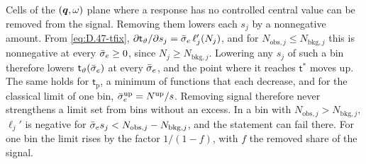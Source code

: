 Cells of the $(\bm{q},\omega)$ plane where a response has no controlled central value can be removed from the signal. Removing them lowers each $s_j$ by a nonnegative amount. From \cref{eq:D.47-tfix}, $\partial\mathsf{t}_\vartheta/\partial s_j = \bar{\sigma}_{e}\,\ell_j'(N_j)$, and for $N_{\mathrm{obs},j} \le N_{\mathrm{bkg},j}$ this is nonnegative at every $\bar{\sigma}_{e} \ge 0$, since $N_j \ge N_{\mathrm{bkg},j}$. Lowering any $s_j$ of such a bin therefore lowers $\mathsf{t}_\vartheta(\bar{\sigma}_{e})$ at every $\bar{\sigma}_{e}$, and the point where it reaches $\mathsf{t}^*$ moves up. The same holds for $\mathsf{t}_{\mathrm{p}}$, a minimum of functions that each decrease, and for the classical limit of one bin, $\bar{\sigma}_{e}^{\mathrm{up}} = N^{\mathrm{up}}/s$. Removing signal therefore never strengthens a limit set from bins without an excess. In a bin with $N_{\mathrm{obs},j} > N_{\mathrm{bkg},j}$, $\ell_j'$ is negative for $\bar{\sigma}_{e} s_j < N_{\mathrm{obs},j} - N_{\mathrm{bkg},j}$, and the statement can fail there. For one bin the limit rises by the factor $1/(1 - f)$, with $f$ the removed share of the signal.
